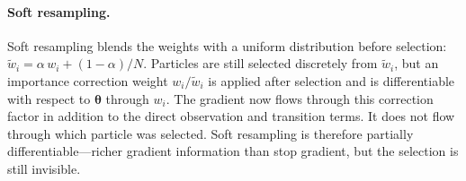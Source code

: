 \documentclass{article}
\renewcommand{\v}[1]{ \ensuremath{ {\mathbf{#1}} }}
\begin{document}
\paragraph{Soft resampling.}
Soft resampling \cite{karkus2018particle} blends the weights with a uniform distribution before selection: $\tilde{w}_i = \alpha\, w_i + (1-\alpha)/N$. Particles are still selected discretely from $\tilde{w}_i$, but an importance correction weight $w_i / \tilde{w}_i$ is applied after selection and is differentiable with respect to $\v\theta$ through $w_i$. The gradient now flows through this correction factor in addition to the direct observation and transition terms. It does not flow through which particle was selected. Soft resampling is therefore partially differentiable---richer gradient information than stop gradient, but the selection is still invisible.
\end{document}
